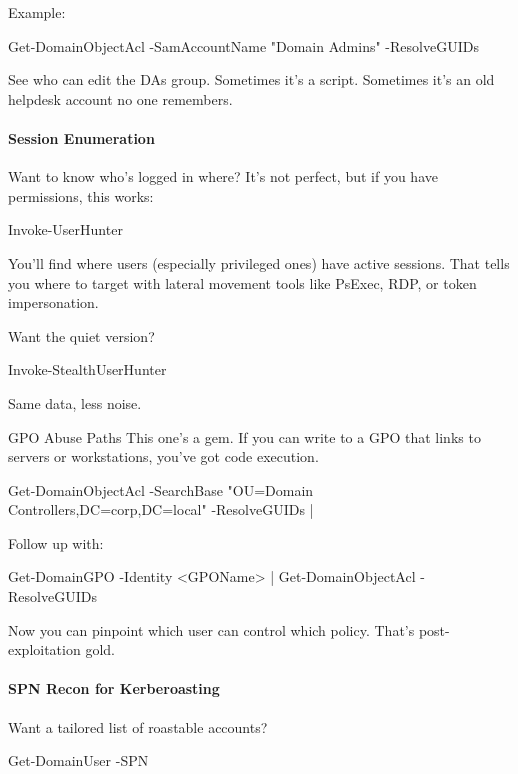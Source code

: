 Example:

 

 

Get-DomainObjectAcl -SamAccountName "Domain Admins" -ResolveGUIDs

See who can edit the DAs group. Sometimes it’s a script. Sometimes it’s an old helpdesk account no one remembers.

\paragraph{   Session Enumeration}

Want to know who’s logged in where? It’s not perfect, but if you have permissions, this works:

 

 

Invoke-UserHunter

You’ll find where users (especially privileged ones) have active sessions. That tells you where to target with lateral movement tools like PsExec, RDP, or token impersonation.

Want the quiet version?

 

 

Invoke-StealthUserHunter

Same data, less noise.

GPO Abuse Paths
This one’s a gem. If you can write to a GPO that links to servers or workstations, you’ve got code execution.

Get-DomainObjectAcl -SearchBase "OU=Domain Controllers,DC=corp,DC=local" -ResolveGUIDs |


Follow up with:

 

 

Get-DomainGPO -Identity <GPOName> | Get-DomainObjectAcl -ResolveGUIDs

Now you can pinpoint which user can control which policy. That’s post-exploitation gold.

\paragraph{   SPN Recon for Kerberoasting}

Want a tailored list of roastable accounts?


Get-DomainUser -SPN

